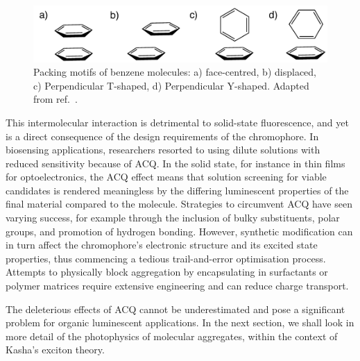 \begin{figure}[t]
\centering
  \includegraphics[width=0.7\linewidth]{1Intro/Stacking.pdf}
  \caption[Stacking motifs of benzene]{Packing motifs of benzene molecules: a) face-centred, b) displaced, c) Perpendicular T-shaped, d) Perpendicular Y-shaped. Adapted from ref.~.}
  \label{figure: Benzene_Stacking}
\end{figure}

This intermolecular interaction is detrimental to solid-state fluorescence, and yet is a direct consequence of the design requirements of the chromophore. In biosensing applications, researchers resorted to using dilute solutions with reduced sensitivity because of \ac{ACQ}.\cite{Thomas2007,Kwok2015} In the solid state, for instance in thin films for optoelectronics, the \ac{ACQ} effect means that solution screening for viable candidates is rendered meaningless by the differing luminescent properties of the final material compared to the molecule. Strategies to circumvent \ac{ACQ} have seen varying success, for example through the inclusion of bulky substituents, polar groups, and promotion of hydrogen bonding.\cite{Hong2009,Zhang2013,Mei2014,Mei2015} However, synthetic modification can in turn affect the chromophore's electronic structure and its excited state properties, thus commencing a tedious trail-and-error optimisation process. Attempts to physically block aggregation by encapsulating in surfactants or polymer matrices require extensive engineering and can reduce charge transport.\cite{Hong2009,Chen2000,Lee2013} 

The deleterious effects of \ac{ACQ} cannot be underestimated and pose a significant problem for organic luminescent applications. In the next section, we shall look in more detail of the photophysics of molecular aggregates, within the context of Kasha's exciton theory.
